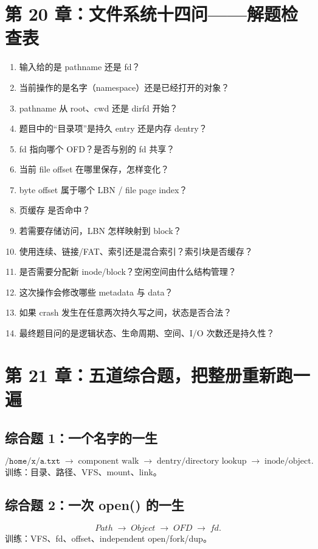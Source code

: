 \documentclass[11pt,a4paper]{ctexart}
\newcommand{\arr}{\;\longrightarrow\;}
\begin{document}
\section{第 20 章：文件系统十四问——解题检查表}
\begin{method}
\begin{enumerate}
  \item 输入给的是 pathname 还是 fd？
  \item 当前操作的是名字（namespace）还是已经打开的对象？
  \item pathname 从 root、cwd 还是 dirfd 开始？
  \item 题目中的“目录项”是持久 entry 还是内存 dentry？
  \item fd 指向哪个 OFD？是否与别的 fd 共享？
  \item 当前 file offset 在哪里保存，怎样变化？
  \item byte offset 属于哪个 LBN / file page index？
  \item 页缓存 是否命中？
  \item 若需要存储访问，LBN 怎样映射到 block？
  \item 使用连续、链接/FAT、索引还是混合索引？索引块是否缓存？
  \item 是否需要分配新 inode/block？空闲空间由什么结构管理？
  \item 这次操作会修改哪些 metadata 与 data？
  \item 如果 crash 发生在任意两次持久写之间，状态是否合法？
  \item 最终题目问的是逻辑状态、生命周期、空间、I/O 次数还是持久性？
\end{enumerate}
\end{method}

\section{第 21 章：五道综合题，把整册重新跑一遍}
\subsection*{综合题 1：一个名字的一生}
\[
\texttt{/home/x/a.txt}\arr\text{component walk}\arr\text{dentry/directory lookup}\arr\text{inode/object}.
\]
训练：目录、路径、VFS、mount、link。

\subsection*{综合题 2：一次 open() 的一生}
\[
Path\arr Object\arr OFD\arr fd.
\]
训练：VFS、fd、offset、independent open/fork/dup。
\end{document}
